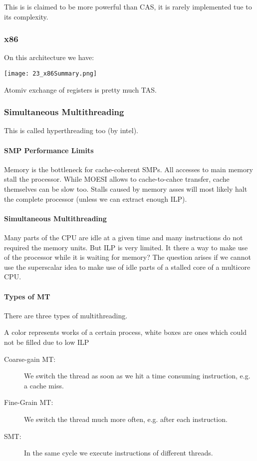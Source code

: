 This is is claimed to be more powerful than CAS, it is rarely implemented tue to its complexity.

\subsubsection{x86}
On this architecture we have:

\texttt{[image: 23\_x86Summary.png]}

Atomiv exchange of registers is pretty much TAS.

\subsubsection{Simultaneous Multithreading}
This is called hyperthreading too (by intel).

\paragraph{SMP Performance Limits}
Memory is the bottleneck for cache-coherent SMPs. All accesses to main memory stall the processor. While MOESI allows to cache-to-cahce transfer, cache themselves can be slow too. Stalls caused by memory asses will most likely halt the complete processor (unless we can extract enough ILP).

\paragraph{Simultaneous Multithreading}
Many parts of the CPU are idle at a given time and many instructions do not required the memory units. But ILP is very limited. It there a way to make use of the processor while it is waiting for memory? The question arises if we cannot use the superscalar idea to make use of idle parts of a stalled core of a multicore CPU.

\paragraph{Types of MT}
There are three types of multithreading.

A color represents works of a certain process, white boxes are ones which could not be filled due to low ILP

\begin{description}
    \item[Coarse-gain MT:] We switch the thread as soon as we hit a time consuming instruction, e.g. a cache miss.
    \item[Fine-Grain MT:] We switch the thread much more often, e.g. after each instruction.
    \item[SMT:] In the same cycle we execute instructions of different threads.
\end{description}

